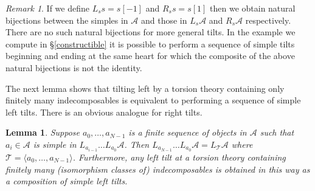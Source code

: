 \documentclass{article}
\theoremstyle{plain}
\newtheorem{lemma}[theorem]{Lemma}     %
\theoremstyle{definition}
\theoremstyle{remark}
\newtheorem{remark}[theorem]{Remark}
\newcommand{\cat}[1]{\mathcal{#1}}
\begin{document}
\begin{remark}
If we define $L_ss=s[-1]$ and $R_ss=s[1]$ then we obtain natural bijections between the simples in $\cat{A}$ and those in $L_s\cat{A}$ and $R_s\cat{A}$ respectively. There are no such natural bijections  for more general tilts. In the example we compute in \S\ref{constructible} it is possible to perform a sequence of  simple tilts beginning and ending at the same heart for which the composite of the above natural bijections is not the identity.
\end{remark}

The next lemma shows that tilting left by a torsion theory containing only finitely many indecomposables is equivalent to performing a sequence of simple left tilts. There is an obvious analogue for right tilts.
\begin{lemma}
\label{factorisation}
Suppose $a_0,\ldots,a_{N-1}$ is a finite sequence of objects in $\cat{A}$ such that $a_i\in \cat{A}$ is simple in $L_{a_{i-1}}\ldots L_{a_0}\cat{A}$. Then $L_{a_{N-1}}\ldots L_{a_0}\cat{A}=L_\cat{T}\cat{A}$ where $\cat{T} = \langle a_0,\ldots,a_{N-1}\rangle$. Furthermore, any left tilt at a torsion theory containing finitely many (isomorphism classes of) indecomposables is obtained in this way as a composition of simple left tilts.
\end{lemma}
\end{document}
